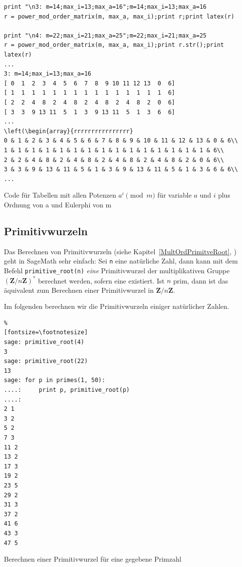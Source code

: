 \begin{refsegment}
\begin{sagecode}
\begin{Verbatim}
print "\n3: m=14;max_i=13;max_a=16";m=14;max_i=13;max_a=16
r = power_mod_order_matrix(m, max_a, max_i);print r;print latex(r)

print "\n4: m=22;max_i=21;max_a=25";m=22;max_i=21;max_a=25
r = power_mod_order_matrix(m, max_a, max_i);print r.str();print latex(r)
...
3: m=14;max_i=13;max_a=16
[ 0  1  2  3  4  5  6  7  8  9 10 11 12 13  0  6]
[ 1  1  1  1  1  1  1  1  1  1  1  1  1  1  1  6]
[ 2  2  4  8  2  4  8  2  4  8  2  4  8  2  0  6]
[ 3  3  9 13 11  5  1  3  9 13 11  5  1  3  6  6]
...
\left(\begin{array}{rrrrrrrrrrrrrrrr}
0 & 1 & 2 & 3 & 4 & 5 & 6 & 7 & 8 & 9 & 10 & 11 & 12 & 13 & 0 & 6\\
1 & 1 & 1 & 1 & 1 & 1 & 1 & 1 & 1 & 1 & 1 & 1 & 1 & 1 & 1 & 6\\
2 & 2 & 4 & 8 & 2 & 4 & 8 & 2 & 4 & 8 & 2 & 4 & 8 & 2 & 0 & 6\\
3 & 3 & 9 & 13 & 11 & 5 & 1 & 3 & 9 & 13 & 11 & 5 & 1 & 3 & 6 & 6\\
...
\end{Verbatim}
\caption{Code für Tabellen mit allen Potenzen $a^i \pmod{m}$ für variable $a$ und $i$ plus Ordnung von a und Eulerphi von m}
\end{sagecode}




\hypertarget{nt:AppArith3a2}{}
\subsection{Primitivwurzeln}
\label{nt:AppArith3a2}
\label{primitive-roots-with-sage}

Das Berechnen von Primitivwurzeln
(siehe Kapitel~\ref{MultOrdPrimitveRoot}, \glqq {}\grqq)
geht in SageMath sehr einfach: Sei \verb!n! eine natürliche Zahl, dann kann mit dem Befehl
\verb!primitive_root(n)! \textit{eine} Primitivwurzel der multiplikativen Gruppe
$(\mathbf{Z} / n \mathbf{Z})^{\ast}$ berechnet werden, sofern eine existiert.
Ist $n$ prim, dann ist das äquivalent zum Berechnen einer Primitivwurzel in
$\mathbf{Z} / n \mathbf{Z}$.

 Im folgenden berechnen wir die Primitivwurzeln einiger natürlicher Zahlen.

\begin{sagecode}
\begin{Verbatim}%
[fontsize=\footnotesize]
sage: primitive_root(4)
3
sage: primitive_root(22)
13
sage: for p in primes(1, 50):
....:     print p, primitive_root(p)
....:
2 1
3 2
5 2
7 3
11 2
13 2
17 3
19 2
23 5
29 2
31 3
37 2
41 6
43 3
47 5
\end{Verbatim}
\caption{Berechnen einer Primitivwurzel für eine gegebene Primzahl}
\end{sagecode}


\end{refsegment}

